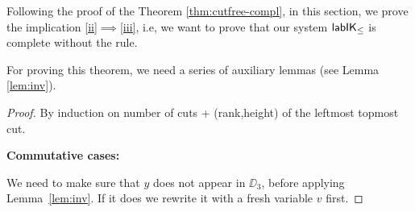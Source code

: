 	
	
	Following the proof of the Theorem \ref{thm:cutfree-compl}, in this section, we prove the implication \ref{ii}$\implies$\ref{iii}, i.e, we want to prove that our system $\mathsf{lab}\mathsf{IK}_{\le}$ is complete without the  rule.
	
	For proving this theorem, we need a series of auxiliary lemmas (see Lemma \ref{lem:inv}).
	
	\begin{proof}
		
		By induction on number of cuts + (rank,height) of the leftmost topmost cut.
		
		\textbf{Commutative cases:}\label{commutative-cases}
		
		\begin{smallequation*}
	\reducesto
\end{smallequation*}

\begin{smallequation*}\hspace*{-3.5em}
\end{smallequation*}

We need to make sure that $y$ does not appear in $\DD_3$, before applying Lemma~\ref{lem:inv}.
%
If it does we rewrite it with a fresh variable $v$ first.


\end{proof}
